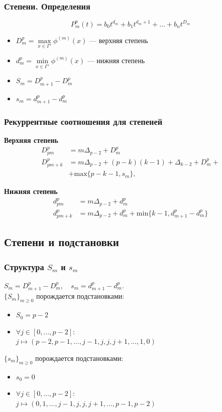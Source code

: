 \begin{frame}
\frametitle{Степени. Определения}

$$P_m^p(t) = b_0 t^{d_m} + b_1 t^{d_{m}+1} + \ldots + b_{n}t^{D_m}$$
\begin{itemize}
\item$D_m^p = \max\limits_{x \in \Gamma'} \phi^{(m)}(x)$ --- верхняя степень
\item$d_m^p = \min\limits_{x \in \Gamma'} \phi^{(m)}(x)$ --- нижняя степень
\item$S_m = D_{m+1}^p - D_{m}^p$
\item$s_m = d_{m+1}^p - d_m^p$
\end{itemize}
\end{frame}


\begin{frame}
\frametitle{Рекуррентные соотношения для степеней}

\textbf{Верхняя степень}
\begin{align*}
  D_{pm}^p &= m \Delta_{p-2} + D_m^p \\
  D_{pm+k}^p &= m \Delta_{p-2}+(p-k)(k-1)+\Delta_{k-2}+D_m^p+\\
   &+ \mathrm{max}\{p-k-1, s_m\},
\end{align*}

\textbf{Нижняя степень}
\begin{align*}
  d_{pm}^p &= m \Delta_{p-2} + d_m^p \\
  d_{pm+k}^p &= m \Delta_{p-2}+d_m^p + \mathrm{min}\{k-1, d_{m+1}^p-d_m^p\}
\end{align*}
\end{frame}

\subsection{Степени и подстановки}
\begin{frame}
\frametitle{Структура $S_m$ и $s_m$}
$S_m = D_{m+1}^p-D_m^p, \quad s_m = d_{m+1}^p-d_m^p$.\bigskip\\

 $\{S_m\}_{m \ge 0}$ порождается подстановками:
\begin{itemize}
\item $S_0 = p-2$
\item $\forall j \in \left[0, \ldots, p-2 \right]: $\\$ j \mapsto (p-2, p-1,\ldots,j - 1, j, j , j+1, \ldots, 1, 0)$
\end{itemize}
\bigskip
 $\{s_m\}_{m \ge 0}$ порождается подстановками:
\begin{itemize}
\item $s_0 = 0$
\item $\forall j \in \left[0, \ldots, p-2 \right]: $\\$ j \mapsto (0, 1,\ldots,j - 1, j, j , j+1, \ldots, p-1, p-2)$
\end{itemize}
\end{frame}

